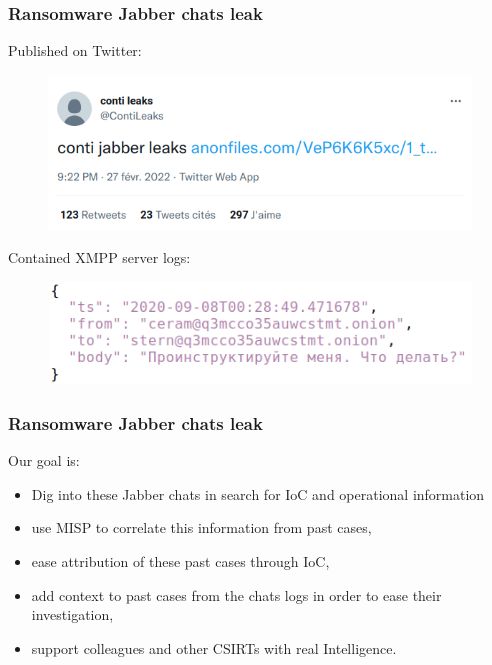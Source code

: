 \begin{frame}[fragile]
    \frametitle{Ransomware Jabber chats leak}
    Published on Twitter:
    \begin{figure}[t]
        \includegraphics[width=.8\textwidth]{contileaks-twitter.png}
        \centering
    \end{figure}

    Contained XMPP server logs:
    \begin{figure}[t]
        \includegraphics[width=.6\textwidth]{contileaks-json.png}
        \centering
    \end{figure}
\end{frame}


\begin{frame}[fragile]
    \frametitle{Ransomware Jabber chats leak}
    Our goal is:
    \begin{itemize}
        \item Dig into these Jabber chats in search for IoC and operational information
        \item use MISP to correlate this information from past cases,
        \item ease attribution of these past cases through IoC,
        \item add context to past cases from the chats logs in order to ease their investigation,
        \item support colleagues and other CSIRTs with real Intelligence.
    \end{itemize}
\end{frame}

